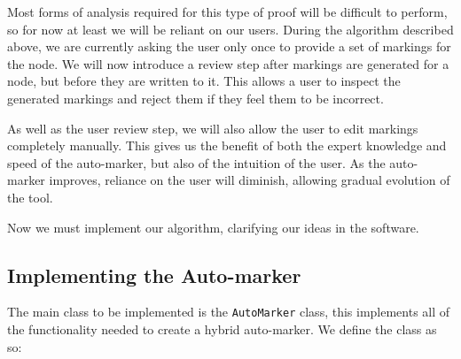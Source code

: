 \documentclass[twoside,a4paper]{report}
\begin{document}
Most forms of analysis required for this type of proof will be difficult to perform, so for now at least we will be reliant on our users. During the
algorithm described above, we are currently asking the user only once to provide a set of markings for the node. We will now introduce a review step
after markings are generated for a node, but before they are written to it. This allows a user to inspect the generated markings and reject them if
they feel them to be incorrect.

As well as the user review step, we will also allow the user to edit markings completely manually. This gives us the benefit of both the expert
knowledge and speed of the auto-marker, but also of the intuition of the user. As the auto-marker improves, reliance on the user will diminish, allowing
gradual evolution of the tool.

Now we must implement our algorithm, clarifying our ideas in the software.

\subsection{Implementing the Auto-marker}

The main class to be implemented is the \texttt{AutoMarker} class, this implements all of the functionality needed to create a hybrid auto-marker.
We define the class as so:
\end{document}
